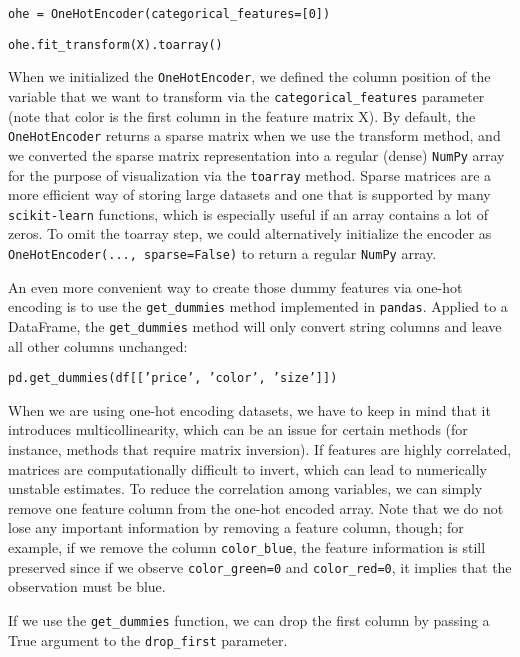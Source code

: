 \documentclass[11pt]{article}
\begin{document}
    \texttt{ohe = OneHotEncoder(categorical\_features=[0])}

    \texttt{ohe.fit\_transform(X).toarray()}

    When we initialized the \texttt{OneHotEncoder}, we defined the column position of the variable that we want to transform via the \texttt{categorical\_features} parameter (note that color is the first column in the feature matrix X).
    By default, the \texttt{OneHotEncoder} returns a sparse matrix when we use the transform method, and we converted the sparse matrix representation into a regular (dense) \texttt{NumPy} array for the purpose of visualization via the \texttt{toarray} method.
    Sparse matrices are a more efficient way of storing large datasets and one that is supported by many \texttt{scikit-learn} functions, which is especially useful if an array contains a lot of zeros.
    To omit the toarray step, we could alternatively initialize the encoder as \texttt{OneHotEncoder(..., sparse=False)} to return a regular \texttt{NumPy} array.

    An even more convenient way to create those dummy features via one-hot encoding is to use the \texttt{get\_dummies} method implemented in \texttt{pandas}.
    Applied to a DataFrame, the \texttt{get\_dummies} method will only convert string columns and leave all other columns unchanged:

    \vspace{3mm}

    \texttt{pd.get\_dummies(df[['price', 'color', 'size']])}

    \vspace{3mm}

    When we are using one-hot encoding datasets, we have to keep in mind that it introduces multicollinearity, which can be an issue for certain methods (for instance, methods that require matrix inversion).
    If features are highly correlated, matrices are computationally difficult to invert, which can lead to numerically unstable estimates.
    To reduce the correlation among variables, we can simply remove one feature column from the one-hot encoded array.
    Note that we do not lose any important information by removing a feature column, though;
    for example, if we remove the column \texttt{color\_blue}, the feature information is still preserved since if we observe \texttt{color\_green=0} and \texttt{color\_red=0}, it implies that the observation must be blue.

    If we use the \texttt{get\_dummies} function, we can drop the first column by passing a True argument to the \texttt{drop\_first} parameter.
\end{document}

